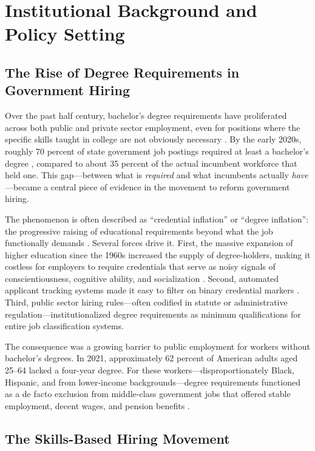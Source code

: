 \documentclass[12pt]{article}
\begin{document}
\section{Institutional Background and Policy Setting} \label{sec:background}

\subsection{The Rise of Degree Requirements in Government Hiring}

Over the past half century, bachelor's degree requirements have proliferated across both public and private sector employment, even for positions where the specific skills taught in college are not obviously necessary \citep{DegreeInflation2017}. By the early 2020s, roughly 70 percent of state government job postings required at least a bachelor's degree \citep{BurningGlass2022}, compared to about 35 percent of the actual incumbent workforce that held one. This gap---between what is \emph{required} and what incumbents actually \emph{have}---became a central piece of evidence in the movement to reform government hiring.

The phenomenon is often described as ``credential inflation'' or ``degree inflation'': the progressive raising of educational requirements beyond what the job functionally demands \citep{FullerRaman2017}. Several forces drive it. First, the massive expansion of higher education since the 1960s increased the supply of degree-holders, making it costless for employers to require credentials that serve as noisy signals of conscientiousness, cognitive ability, and socialization \citep{Spence1973}. Second, automated applicant tracking systems made it easy to filter on binary credential markers \citep{FullerSarvestani2022}. Third, public sector hiring rules---often codified in statute or administrative regulation---institutionalized degree requirements as minimum qualifications for entire job classification systems.

The consequence was a growing barrier to public employment for workers without bachelor's degrees. In 2021, approximately 62 percent of American adults aged 25--64 lacked a four-year degree. For these workers---disproportionately Black, Hispanic, and from lower-income backgrounds---degree requirements functioned as a de facto exclusion from middle-class government jobs that offered stable employment, decent wages, and pension benefits \citep{OpportunityAtWork2022}.

\subsection{The Skills-Based Hiring Movement}
\end{document}

